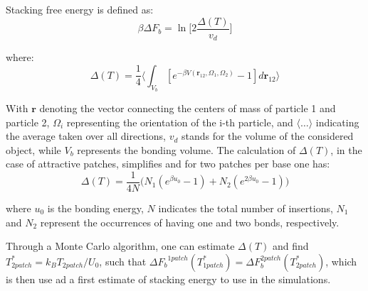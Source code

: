 \documentclass[aip,jcp, amsmath, amssymb, reprint]{revtex4-1}
\begin{document}
Stacking free energy is defined as:
\begin{equation}
	\beta\Delta F_b=\ln \bigg[2\frac{\Delta(T)}{v_d}\bigg]
	\label{deltaf}
\end{equation}

where:
\begin{equation}
\label{deltat}
	\Delta(T)=\frac{1}{4}\bigg\langle \int_{V_b} [e^{-\beta V(\textbf{r}_{12}, \Omega_1, \Omega_2)}-1]d\textbf{r}_{12}\bigg\rangle
\end{equation}

With $\textbf{r}$ denoting the vector connecting the centers of mass of particle 1 and particle 2, $\Omega_i$
representing the orientation of the i-th particle, and $\langle\ldots\rangle$ indicating the average taken over all
directions, $v_d$ stands for the volume of the considered object, while $V_b$ represents the bonding volume. The
calculation of $\Delta (T)$, in the case of attractive patches, simplifies and for two patches per base one has: 
\begin{equation}
\label{deltat2}
	\Delta(T)=\frac{1}{4N}\big( N_1(e^{\beta u_0}-1)+N_2(e^{2\beta u_0}-1)\big)
\end{equation}

where $u_0$ is the bonding energy, $N$ indicates the total number of insertions, $N_1$ and $N_2$ represent the occurrences of having one and two
bonds, respectively. 

Through a Monte Carlo algorithm, one can estimate $\Delta(T)$ and find $T^*_{2 patch}=k_B T_{2 patch}/U_0$, such that ${\Delta F_b}^{1 patch}(T^*_{1 patch})=\Delta F_b^{2 patch}(T^*_{2 patch})$, 
which is then use ad a first estimate of stacking energy to use in the simulations.



\end{document}
